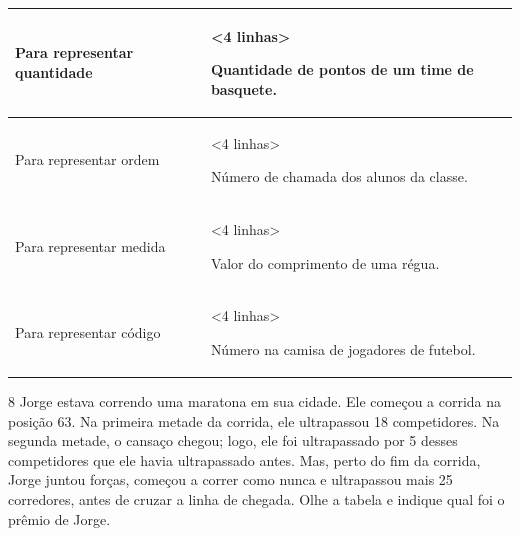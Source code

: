 \begin{longtable}[]{@{}ll@{}}
\toprule
\begin{minipage}[b]{0.48\columnwidth}\raggedright\strut
Para representar quantidade\strut
\end{minipage} & \begin{minipage}[b]{0.48\columnwidth}\raggedright\strut
\textless{}4 linhas\textgreater{}

Quantidade de pontos de um time de basquete.\strut
\end{minipage}\tabularnewline
\midrule
\endhead
\begin{minipage}[t]{0.48\columnwidth}\raggedright\strut
Para representar ordem\strut
\end{minipage} & \begin{minipage}[t]{0.48\columnwidth}\raggedright\strut
\textless{}4 linhas\textgreater{}

Número de chamada dos alunos da classe.\strut
\end{minipage}\tabularnewline
\begin{minipage}[t]{0.48\columnwidth}\raggedright\strut
Para representar medida\strut
\end{minipage} & \begin{minipage}[t]{0.48\columnwidth}\raggedright\strut
\textless{}4 linhas\textgreater{}

Valor do comprimento de uma régua.\strut
\end{minipage}\tabularnewline
\begin{minipage}[t]{0.48\columnwidth}\raggedright\strut
Para representar código\strut
\end{minipage} & \begin{minipage}[t]{0.48\columnwidth}\raggedright\strut
\textless{}4 linhas\textgreater{}

Número na camisa de jogadores de futebol.\strut
\end{minipage}\tabularnewline
\bottomrule
\end{longtable}


\num{8} Jorge estava correndo uma maratona em sua cidade. Ele começou a corrida
na posição 63. Na primeira metade da corrida, ele ultrapassou 18
competidores. Na segunda metade, o cansaço chegou; logo, ele foi
ultrapassado por 5 desses competidores que ele havia ultrapassado antes.
Mas, perto do fim da corrida, Jorge juntou forças, começou a correr como
nunca e ultrapassou mais 25 corredores, antes de cruzar a linha de
chegada. Olhe a tabela e indique qual foi o prêmio de Jorge.

